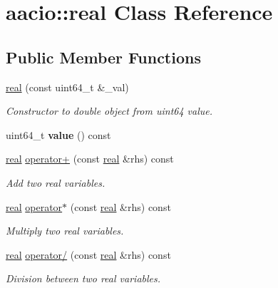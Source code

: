 \hypertarget{classaacio_1_1real}{}\section{aacio\+:\+:real Class Reference}
\label{classaacio_1_1real}
\subsection*{Public Member Functions}
\begin{DoxyCompactItemize}
\item 
\mbox{\hyperlink{classaacio_1_1real_a79591ac3c57ad6295b75cef14d8e9fdb}{real}} (const uint64\+\_\+t \&\+\_\+val)
\begin{DoxyCompactList}\small\item\em Constructor to double object from uint64 value. \end{DoxyCompactList}\item 
\mbox{\label{classaacio_1_1real_a0dd904bccfef5cda2d540df1db71c138}} 
uint64\+\_\+t {\bfseries value} () const
\item 
\mbox{\hyperlink{classaacio_1_1real}{real}} \mbox{\hyperlink{group__real_gad6bd588e0aa69227458b61d2ca48bacc}{operator+}} (const \mbox{\hyperlink{classaacio_1_1real}{real}} \&rhs) const
\begin{DoxyCompactList}\small\item\em Add two real variables. \end{DoxyCompactList}\item 
\mbox{\hyperlink{classaacio_1_1real}{real}} \mbox{\hyperlink{group__real_gaf2078aa77b91b501d0f4c068c0a9c8fe}{operator$\ast$}} (const \mbox{\hyperlink{classaacio_1_1real}{real}} \&rhs) const
\begin{DoxyCompactList}\small\item\em Multiply two real variables. \end{DoxyCompactList}\item 
\mbox{\hyperlink{classaacio_1_1real}{real}} \mbox{\hyperlink{group__real_gaaedf18a9e2e314ff892f7f942b09cbcf}{operator/}} (const \mbox{\hyperlink{classaacio_1_1real}{real}} \&rhs) const
\begin{DoxyCompactList}\small\item\em Division between two real variables. \end{DoxyCompactList}\end{DoxyCompactItemize}
